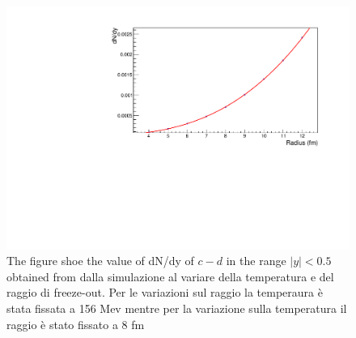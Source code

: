 \documentclass[12pt,a4paper]{book}
\begin{document}
		\begin{figure}
			\centering
		\includegraphics[width=0.8 \linewidth]{pictures/var_radius.pdf}
		\caption{The figure shoe the value of dN/dy of $c-d$ in the range $|y|<0.5$ obtained from dalla simulazione al variare della temperatura e del raggio di freeze-out. Per le variazioni sul raggio la temperaura è stata fissata a 156 Mev mentre per la variazione sulla temperatura il raggio è stato fissato a 8 fm}
		\label{fig:var_radius}
	\end{figure}
	
\end{document}
